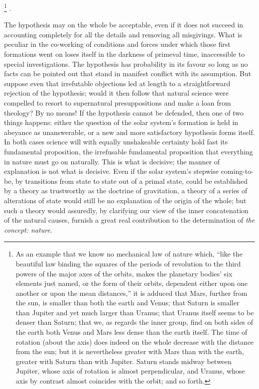 \documentclass[12pt,a4paper]{book}
\renewcommand{\thefootnote}{*)}
\begin{document}
\footnote{%
As an example that we know no mechanical law of nature which, ``like the beautiful law binding the squares of
the periods of revolution to the third powers of the major axes of the orbits, makes the planetary bodies'
six elements just named, or the form of their orbits, dependent either upon one another or upon the mean
distances,'' it is adduced that Mars, further from the sun, is smaller than both the earth and Venus; that
Saturn is smaller than Jupiter and yet much larger than Uranus; that Uranus itself seems to be denser than
Saturn; that we, as regards the inner group, find on both sides of the earth both Venus and Mars less dense
than the earth itself. The time of rotation (about the axis) does indeed on the whole decrease with the
distance from the sun; but it is nevertheless greater with Mars than with the earth, greater with Saturn than
with Jupiter. Saturn stands midway between Jupiter, whose axis of rotation is almost perpendicular, and
Uranus, whose axis by contrast almost coincides with the orbit; and so forth.}%
\renewcommand{\thefootnote}{*)}%
.

The hypothesis may on the whole be acceptable, even if it does not succeed in accounting completely for all
the details and removing all misgivings. What is peculiar in the co-working of conditions and forces under
which those first formations went on loses itself in the darkness of primeval time, inaccessible to special
investigations. The hypothesis has probability in its favour so long as no facts can be pointed out that
stand in manifest conflict with its assumption. But suppose even that irrefutable objections
led at length to a straightforward rejection of the hypothesis; would it then follow that natural science
were compelled to resort to supernatural presuppositions and make a loan from theology? By no means! If the
hypothesis cannot be defended, then one of two things happens: either the question of the solar system's
formation is held in abeyance as unanswerable, or a new and more satisfactory hypothesis forms itself. In
both cases science will with equally unshakeable certainty hold fast its fundamental proposition, the
irrefusable fundamental proposition that everything in nature must go on naturally. This is what is
decisive; the manner of explanation is not what is decisive. Even if the solar system's stepwise
coming-to-be, by transitions from state to state out of a primal state, could be established by a theory as
trustworthy as the doctrine of gravitation, a theory of a series of alterations of state would still be no
explanation of the origin of the whole; but such a theory would assuredly, by clarifying our view of the
inner concatenation of the natural causes, furnish a great real contribution to the determination of
\emph{the concept: nature}.
\end{document}
